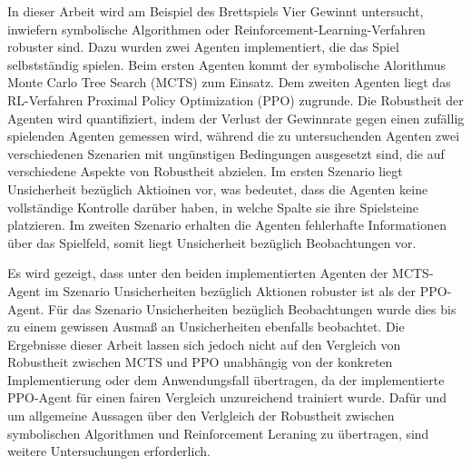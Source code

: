 In dieser Arbeit wird am Beispiel des Brettspiels Vier Gewinnt untersucht, inwiefern symbolische Algorithmen oder Reinforcement-Learning-Verfahren robuster sind. Dazu wurden zwei Agenten implementiert, die das Spiel selbstständig spielen. Beim ersten Agenten kommt der symbolische Alorithmus Monte Carlo Tree Search (MCTS) zum Einsatz. Dem zweiten Agenten liegt das RL-Verfahren Proximal Policy Optimization (PPO) zugrunde. Die Robustheit der Agenten wird quantifiziert, indem der Verlust der Gewinnrate gegen einen zufällig spielenden Agenten gemessen wird, während die zu untersuchenden Agenten zwei verschiedenen Szenarien mit ungünstigen Bedingungen ausgesetzt sind, die auf verschiedene Aspekte von Robustheit abzielen. Im ersten Szenario liegt Unsicherheit bezüglich Aktioinen vor, was bedeutet, dass die Agenten keine vollständige Kontrolle darüber haben, in welche Spalte sie ihre Spielsteine platzieren. Im zweiten Szenario erhalten die Agenten fehlerhafte Informationen über das Spielfeld, somit liegt Unsicherheit bezüglich Beobachtungen vor.

Es wird gezeigt, dass unter den beiden implementierten Agenten der MCTS-Agent im Szenario Unsicherheiten bezüglich Aktionen robuster ist als der PPO-Agent. Für das Szenario Unsicherheiten bezüglich Beobachtungen wurde dies bis zu einem gewissen Ausmaß an Unsicherheiten ebenfalls beobachtet. Die Ergebnisse dieser Arbeit lassen sich jedoch nicht auf den Vergleich von Robustheit zwischen MCTS und PPO unabhängig von der konkreten Implementierung oder dem Anwendungsfall übertragen, da der implementierte PPO-Agent für einen fairen Vergleich unzureichend trainiert wurde. Dafür und um allgemeine Aussagen über den Verlgleich der Robustheit zwischen symbolischen Algorithmen und Reinforcement Leraning zu übertragen, sind weitere Untersuchungen erforderlich.